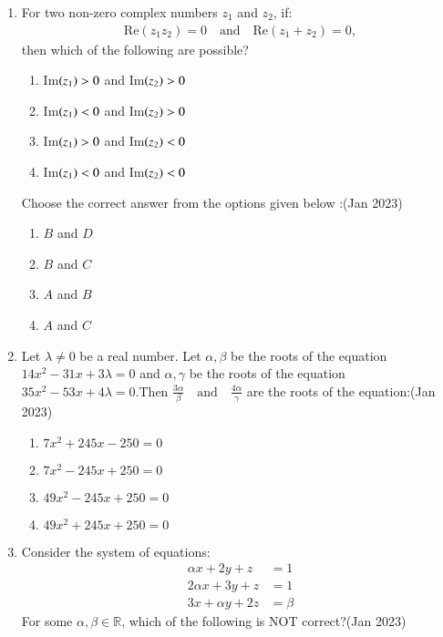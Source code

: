 \documentclass[journal,12pt,onecolumn]{IEEEtran}
\theoremstyle{remark}
\begin{document}
\begin{enumerate}
\item For two non-zero complex numbers  $z_1 $ and $z_2$, if:
\begin{align*}
   \text{Re}(z_1 z_2) = 0 \quad \text{and} \quad \text{Re}(z_1 + z_2) = 0,
\end{align*}
then which of the following are possible?
   \begin{enumerate}
       \item Im$\left(z_1\right) > 0$ and Im$\left(z_2\right) > 0$
       \item Im$\left(z_1\right) < 0$ and Im$\left(z_2\right) > 0$
      \item Im$\left(z_1\right) > 0$ and Im$\left(z_2\right) < 0$
      \item Im$\left(z_1\right) < 0$ and Im$\left(z_2\right) < 0$
   \end{enumerate}
   Choose the correct answer from the options given below :\hfill(Jan 2023)
\begin{multicols}{4}
   \begin{enumerate}
       \item $B$ and $D$
       \item $B$ and $C$
       \item $A$ and $B$
       \item $A$ and $C$
   \end{enumerate}
\end{multicols}
\item Let $\lambda \neq 0$ be a real number. Let $\alpha, \beta$ be the roots of the equation $ 14x^2 - 31x + 3\lambda = 0 $ and $\alpha, \gamma $ be the roots of the equation $ 35x^2 - 53x + 4\lambda = 0. $Then 
$ \frac{3\alpha}{\beta} \quad \text{and} \quad \frac{4\alpha}{\gamma} $ 
are the roots of the equation:\hfill(Jan 2023)
\begin{multicols}{2}
\begin{enumerate}
    \item $ 7x^2 + 245x - 250 = 0$
    \item $ 7x^2 - 245x + 250 = 0$
    \item $ 49x^2 - 245x + 250 = 0$
    \item $ 49x^2 + 245x + 250 = 0 $
\end{enumerate}
\end{multicols}
\item Consider the system of equations:
   \begin{align*}
   \alpha x + 2y + z &= 1 \\
   2\alpha x + 3y + z &= 1 \\
   3x + \alpha y + 2z &= \beta
   \end{align*}
   For some \( \alpha, \beta \in \mathbb{R} \), which of the following is NOT correct?\hfill(Jan 2023)


\end{enumerate}
\end{document}
